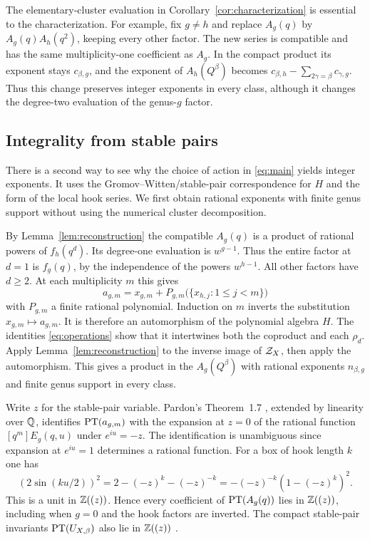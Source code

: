 The elementary-cluster evaluation in Corollary~\ref{cor:characterization}
is essential to the characterization. For example, fix $g\ne h$ and
replace $A_g(q)$ by $A_g(q)A_h(q^2)$, keeping every other factor.
The new series is compatible and has the same multiplicity-one
coefficient as $A_g$. In the compact product its exponent stays
$c_{\beta,g}$, and the exponent of $A_h(Q^\beta)$ becomes
$c_{\beta,h}-\sum_{2\gamma=\beta}c_{\gamma,g}$. Thus this change
preserves integer exponents in every class, although it changes the
degree-two evaluation of the genus-$g$ factor.

\subsection{Integrality from stable pairs}
There is a second way to see why the choice of action in
\eqref{eq:main} yields integer exponents. It uses the
Gromov--Witten/stable-pair correspondence for $H$ and the
form of the local hook series. We first obtain rational exponents
with finite genus support without using the numerical
cluster decomposition.

By Lemma~\ref{lem:reconstruction} the compatible $A_g(q)$ is a
product of rational powers of $f_h(q^d)$. Its degree-one evaluation
is $w^{g-1}$. Thus the entire factor at $d=1$ is $f_g(q)$, by the
independence of the powers $w^{h-1}$. All other factors have
$d\geq2$. At each multiplicity $m$ this gives
\begin{equation}\label{eq:triangular}
 a_{g,m}=x_{g,m}+P_{g,m}\bigl(\{x_{h,j}:1\le j<m\}\bigr)
\end{equation}
with $P_{g,m}$ a finite rational polynomial. Induction on $m$
inverts the substitution $x_{g,m}\mapsto a_{g,m}$. It is therefore
an automorphism of the polynomial algebra $H$. The identities
\eqref{eq:operations} show that it intertwines both the coproduct
and each $\rho_d$. Apply Lemma~\ref{lem:reconstruction} to the
inverse image of $\mathcal Z_X$, then apply the automorphism. This gives
a product in the $A_g(Q^\beta)$ with rational exponents
$n_{\beta,g}$ and finite genus support in every class.

Write $z$ for the stable-pair variable. Pardon's Theorem~1.7
\cite{Pardon}, extended by linearity over $\mathbb Q$, identifies
$\operatorname{PT}(a_{g,m})$ with the expansion at $z=0$ of the rational
function $[q^m]E_g(q,u)$ under $e^{iu}=-z$. The identification
is unambiguous since expansion at $e^{iu}=1$ determines a rational
function. For a box of hook length $k$ one has
\[
 (2\sin(ku/2))^2=2-(-z)^k-(-z)^{-k}
                 =-(-z)^{-k}(1-(-z)^k)^2 .
\]
This is a unit in $\mathbb Z((z))$. Hence every coefficient of
$\operatorname{PT}(A_g(q))$ lies in $\mathbb Z((z))$, including when $g=0$ and
the hook factors are inverted. The compact stable-pair invariants
$\operatorname{PT}(U_{X,\beta})$ also lie in $\mathbb Z((z))$
\cite[\S3.5]{Pardon}.

